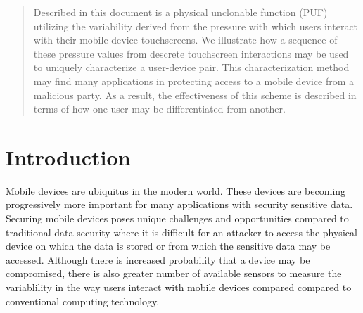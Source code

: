 \documentclass{acm_proc_article-sp}
\begin{document}

\maketitle
\begin{abstract}
Described in this document is a physical unclonable function (PUF) utilizing the variability derived from the pressure with which users interact with their mobile device touchscreens. We illustrate how a sequence of these pressure values from descrete touchscreen interactions may be used to uniquely characterize a user-device pair. This characterization method may find many applications in protecting access to a mobile device from a malicious party. As a result, the effectiveness of this scheme is described in terms of how one user may be differentiated from another.
\end{abstract}




\section{Introduction}
\label{sec:intro}
Mobile devices are ubiquitus in the modern world. These devices are becoming progressively more important for many applications with security sensitive data. 
Securing mobile devices poses unique challenges and opportunities compared to traditional data security where it is difficult for an attacker to access the physical device on which the data is stored or from which the sensitive data may be accessed. Although there is increased probability that a device may be compromised, there is also greater number of available sensors to measure the variablility in the way users interact with mobile devices compared compared to conventional computing technology.
%
\end{document}
